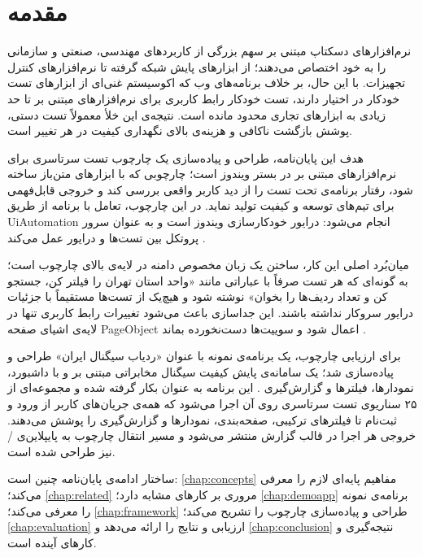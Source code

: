 \chapter{مقدمه}
\label{chap:intro}

نرم‌افزارهای دسکتاپ مبتنی بر
سهم بزرگی از کاربردهای مهندسی، صنعتی و سازمانی را به خود اختصاص می‌دهند؛ از ابزارهای پایش شبکه گرفته تا نرم‌افزارهای کنترل تجهیزات. با این حال، بر خلاف برنامه‌های وب که اکوسیستم غنی‌ای از ابزارهای تست خودکار در اختیار دارند، تست خودکار رابط کاربری برای نرم‌افزارهای مبتنی بر
تا حد زیادی به ابزارهای تجاری محدود مانده است. نتیجه‌ی این خلأ معمولاً تست دستی، پوشش بازگشت ناکافی و هزینه‌ی بالای نگهداری کیفیت در هر تغییر است.

هدف این پایان‌نامه، طراحی و پیاده‌سازی یک
چارچوب تست سرتاسری
برای نرم‌افزارهای مبتنی بر
در بستر ویندوز است؛ چارچوبی که با ابزارهای متن‌باز ساخته شود، رفتار برنامه‌ی تحت تست را از دید کاربر واقعی بررسی کند و خروجی قابل‌فهمی برای تیم‌های توسعه و کیفیت تولید نماید. در این چارچوب، تعامل با برنامه از طریق
\gls{UiAutomation}
انجام می‌شود:
درایور خودکارسازی ویندوز است و
به عنوان سرور پروتکل بین تست‌ها و درایور عمل می‌کند
\cite{appium,winappdriver}.

میان‌بُرد اصلی این کار، ساختن یک
زبان مخصوص دامنه
در لایه‌ی بالای چارچوب است؛ به گونه‌ای که هر تست صرفاً با عباراتی مانند «واحد استان تهران را فیلتر کن، جستجو کن و تعداد ردیف‌ها را بخوان» نوشته شود و هیچ‌یک از تست‌ها مستقیماً با جزئیات درایور سروکار نداشته باشند. این جداسازی باعث می‌شود تغییرات رابط کاربری تنها در لایه‌ی اشیای صفحه
\gls{PageObject}
اعمال شود و سوییت‌ها دست‌نخورده بماند
\cite{fowler2002,meszaros2007}.

برای ارزیابی چارچوب، یک برنامه‌ی نمونه با عنوان «ردیاب سیگنال ایران» طراحی و پیاده‌سازی شد؛ یک سامانه‌ی پایش کیفیت سیگنال مخابراتی مبتنی بر
و
با داشبورد، نمودارها، فیلترها و گزارش‌گیری
\cite{qtdocs,sqlite}. این برنامه به عنوان
بکار گرفته شده و مجموعه‌ای از ۲۵ سناریوی تست سرتاسری روی آن اجرا می‌شود که همه‌ی جریان‌های کاربر \pdash{} از ورود و ثبت‌نام تا فیلترهای ترکیبی، صفحه‌بندی، نمودارها و گزارش‌گیری \pdash{} را پوشش می‌دهند. خروجی هر اجرا در قالب گزارش
منتشر می‌شود
\cite{allure}
و مسیر انتقال چارچوب به پایپلاین‌ی
/ 
نیز طراحی شده است.

ساختار ادامه‌ی پایان‌نامه چنین است: \autoref{chap:concepts}
مفاهیم پایه‌ای لازم را معرفی می‌کند؛ \autoref{chap:related}
مروری بر کارهای مشابه دارد؛ \autoref{chap:demoapp}
برنامه‌ی نمونه را معرفی می‌کند؛ \autoref{chap:framework}
طراحی و پیاده‌سازی چارچوب را تشریح می‌کند؛ \autoref{chap:evaluation}
ارزیابی و نتایج را ارائه می‌دهد و \autoref{chap:conclusion}
نتیجه‌گیری و کارهای آینده است.